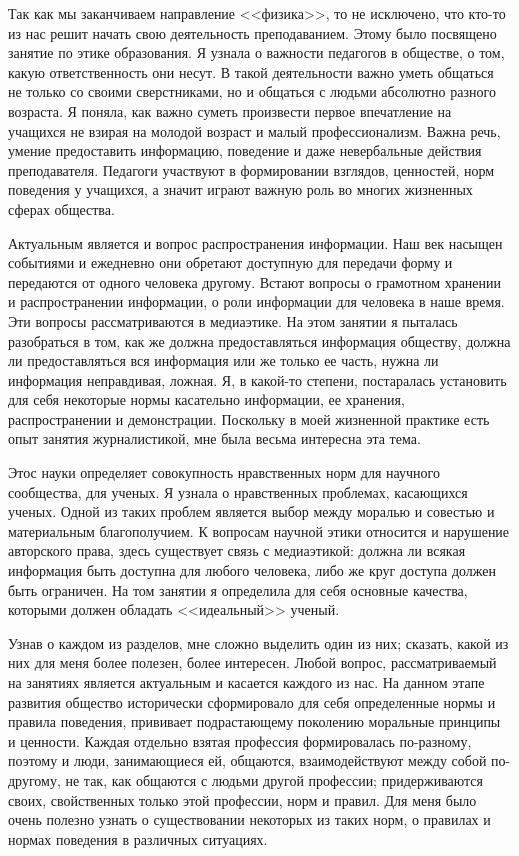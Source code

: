\documentclass[14pt,pscyr]{hedwork}
\begin{document}
  Так как мы заканчиваем направление <<физика>>, то не исключено, что кто-то из
  нас решит начать свою деятельность преподаванием. Этому было посвящено
  занятие по этике образования. Я узнала о важности педагогов в обществе, о
  том, какую ответственность они несут. В такой деятельности важно уметь
  общаться не только со своими сверстниками, но и общаться с людьми абсолютно
  разного возраста. Я поняла, как важно суметь произвести первое впечатление на
  учащихся не взирая на молодой возраст и малый профессионализм. Важна речь,
  умение предоставить информацию, поведение и даже невербальные действия
  преподавателя. Педагоги участвуют в формировании взглядов, ценностей, норм
  поведения у учащихся, а значит играют важную роль во многих жизненных сферах
  общества.
  
  Актуальным является и вопрос распространения информации. Наш век насыщен
  событиями и ежедневно они обретают доступную для передачи форму и передаются
  от одного человека другому. Встают вопросы о грамотном хранении и
  распространении информации, о роли информации для человека в наше время. Эти
  вопросы рассматриваются в медиаэтике. На этом занятии я пыталась разобраться
  в том, как же должна предоставляться информация обществу, должна ли
  предоставляться вся информация или же только ее часть, нужна ли информация
  неправдивая, ложная. Я, в какой-то степени, постаралась установить для себя
  некоторые нормы касательно информации, ее хранения, распространении и
  демонстрации. Поскольку в моей жизненной практике есть опыт занятия
  журналистикой, мне была весьма интересна эта тема.
  
  Этос науки определяет совокупность нравственных норм для научного сообщества,
  для ученых. Я узнала о нравственных проблемах, касающихся ученых. Одной из
  таких проблем является выбор между моралью и совестью и материальным
  благополучием. К вопросам научной этики относится и нарушение авторского
  права, здесь существует связь с медиаэтикой: должна ли всякая информация быть
  доступна для любого человека, либо же круг доступа должен быть ограничен.
  На том занятии я определила для себя основные качества, которыми должен
  обладать <<идеальный>> ученый.
  
  Узнав о каждом из разделов, мне сложно выделить один из них; сказать, какой
  из них для меня более полезен, более интересен. Любой вопрос, рассматриваемый
  на занятиях является актуальным и касается каждого из нас. На данном этапе
  развития общество исторически сформировало для себя определенные нормы и
  правила поведения, прививает подрастающему поколению моральные принципы
  и ценности. Каждая отдельно взятая профессия формировалась по-разному,
  поэтому и люди, занимающиеся ей, общаются, взаимодействуют между собой
  по-другому, не так, как общаются с людьми другой профессии; придерживаются
  своих, свойственных только этой профессии, норм и правил. Для меня было
  очень полезно узнать о существовании некоторых из таких норм, о правилах
  и нормах поведения в различных ситуациях.
\end{document}
